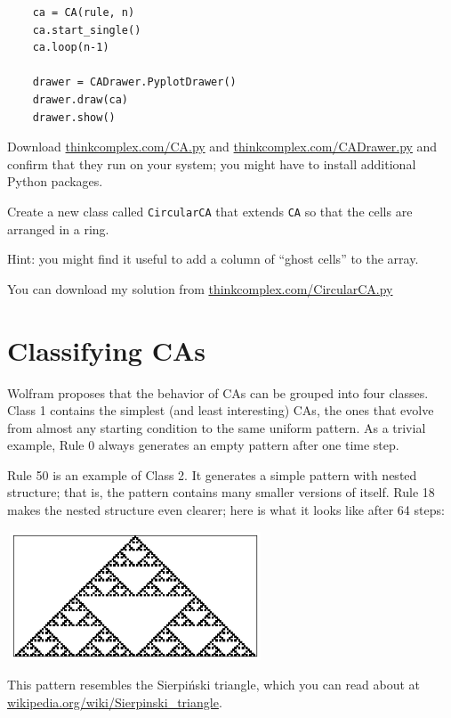 \documentclass[10pt]{book}
\begin{document}
\begin{verbatim}
    ca = CA(rule, n)
    ca.start_single()
    ca.loop(n-1)

    drawer = CADrawer.PyplotDrawer()
    drawer.draw(ca)
    drawer.show()
\end{verbatim}


\begin{ex}

Download \url{thinkcomplex.com/CA.py} and \url{thinkcomplex.com/CADrawer.py}
and confirm that they run on your system; you might have to install
additional Python packages.

Create a new class called {\tt CircularCA} that extends
{\tt CA} so that the cells are arranged in a ring.

Hint: you might find it useful to add a column of ``ghost cells'' to
the array.

You can download my solution from 
\url{thinkcomplex.com/CircularCA.py}

\end{ex}


\section{Classifying CAs}

Wolfram proposes that the behavior of CAs can be grouped
into four classes.  Class 1 contains the simplest (and least
interesting) CAs, the ones that evolve from almost any starting
condition to the same uniform pattern.  As a trivial example,
Rule 0 always generates an empty pattern after one time step.

Rule 50 is an example of Class 2.  It generates a simple pattern with
nested structure; that is, the pattern contains many smaller versions
of itself.  Rule 18 makes the nested structure even clearer; here is
what it looks like after 64 steps:

\beforefig
\centerline{\includegraphics[width=3.0in,height=1.5in]{figs/rule18.eps}}
\afterfig

This pattern resembles the Sierpi\'{n}ski triangle, which 
you can read about at \url{wikipedia.org/wiki/Sierpinski_triangle}.
\end{document}
